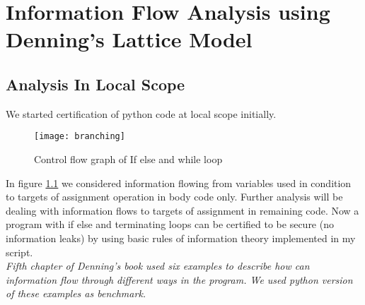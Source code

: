 \chapter{Information Flow Analysis using Denning's Lattice Model}
\label{ch:denning}
\section{Analysis In Local Scope}
We started certification of python code at local scope initially.
\begin{figure}[ht]
	
	\texttt{[image: branching]}
	\caption{Control flow graph of If else and while loop}
	\label{fig:branching}
\end{figure}
In figure \ref{fig:branching} we considered information flowing from variables used in condition to targets of assignment operation in body code only. Further analysis will be dealing with information flows to targets of assignment in remaining code. Now a program with if else and terminating loops can be certified to be secure (no information leaks) by using basic rules of information theory implemented in my script.\\
\textit{Fifth chapter of Denning's book\cite{denning} used six examples to describe how can information flow through different ways in the program. We used python version of these examples as benchmark.}\\
